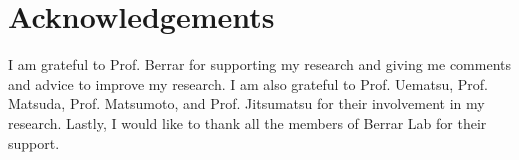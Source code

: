 \chapter*{Acknowledgements}
I am grateful to Prof. Berrar for supporting my research and giving me comments and advice to improve my research.
I am also grateful to Prof. Uematsu, Prof. Matsuda, Prof. Matsumoto, and Prof. Jitsumatsu for their involvement in my research. 
Lastly, I would like to thank all the members of Berrar Lab for their support.
